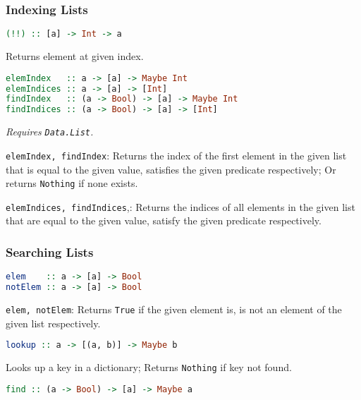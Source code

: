 \documentclass[twocolumn,english]{article}
\begin{document}
\subsubsection{Indexing Lists}

\begin{lstlisting}[language=Haskell,frame=single]
(!!) :: [a] -> Int -> a
\end{lstlisting}


Returns element at given index.

\begin{lstlisting}[language=Haskell,frame=single]
elemIndex   :: a -> [a] -> Maybe Int
elemIndices :: a -> [a] -> [Int]
findIndex   :: (a -> Bool) -> [a] -> Maybe Int
findIndices :: (a -> Bool) -> [a] -> [Int]
\end{lstlisting}


\emph{Requires }\texttt{\emph{Data.List}}\emph{.}

\texttt{elemIndex, findIndex}: Returns the index of the first element
in the given list that is equal to the given value, satisfies the
given predicate respectively; Or returns \texttt{Nothing} if none
exists.

\texttt{elemIndices, findIndices},: Returns the indices of all elements
in the given list that are equal to the given value, satisfy the given
predicate respectively.


\subsubsection{Searching Lists}

\begin{lstlisting}[language=Haskell,frame=single]
elem    :: a -> [a] -> Bool
notElem :: a -> [a] -> Bool
\end{lstlisting}


\texttt{elem, notElem}: Returns \texttt{True} if the given element
is, is not an element of the given list respectively.

\begin{lstlisting}[language=Haskell,frame=single]
lookup :: a -> [(a, b)] -> Maybe b
\end{lstlisting}


Looks up a key in a dictionary; Returns \texttt{Nothing} if key not
found.

\begin{lstlisting}[language=Haskell,frame=single]
find :: (a -> Bool) -> [a] -> Maybe a
\end{lstlisting}
\end{document}
